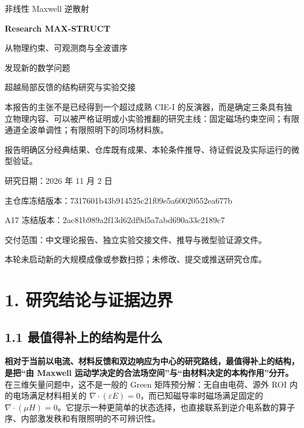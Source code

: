 \documentclass[11pt,a4paper]{article}
\begin{document}
\begin{titlepage}
\vspace*{14mm}
{\Large 非线性 Maxwell 逆散射}\par
\vspace{8mm}
{\Huge\bfseries Research MAX-STRUCT}\par
\vspace{8mm}
{\LARGE 从物理约束、可观测商与全波谱序\par 发现新的数学问题}\par
\vspace{12mm}
{\large 超越局部反馈的结构研究与实验交接}\par
\vspace{14mm}
\begin{minipage}{.92\textwidth}
本报告的主张不是已经得到一个超过成熟 CIE-I 的反演器，而是确定三条具有独立物理内容、可以被严格证明或小实验推翻的研究主线：固定磁场约束空间；有限通道全波单调性；有限照明下的同场材料族。\par
报告明确区分经典结果、仓库既有成果、本轮条件推导、待证假说及实际运行的微型验证。
\end{minipage}
\vfill
{\large 研究日期：2026 年 11 月 2 日}\par
\vspace{3mm}
{\small 主仓库冻结版本：7317601b43b914525c21f09e5a60020552ea677b}\par
{\small A17 冻结版本：2ac81b989a2f13d62df9d5a7abd690a33c2189c7}\par
\vspace{7mm}
{\small 交付范围：中文理论报告、独立实验交接文件、推导与微型验证源文件。\par
本轮未启动新的大规模成像或参数扫掠；未修改、提交或推送研究仓库。}
\end{titlepage}
\tableofcontents
\clearpage
\hypertarget{ux7814ux7a76ux7ed3ux8bbaux4e0eux8bc1ux636eux8fb9ux754c}{%
\section{1.
研究结论与证据边界}\label{ux7814ux7a76ux7ed3ux8bbaux4e0eux8bc1ux636eux8fb9ux754c}}

\hypertarget{ux6700ux503cux5f97ux8865ux4e0aux7684ux7ed3ux6784ux662fux4ec0ux4e48}{%
\subsection{1.1
最值得补上的结构是什么}\label{ux6700ux503cux5f97ux8865ux4e0aux7684ux7ed3ux6784ux662fux4ec0ux4e48}}

\textbf{相对于当前以电流、材料反馈和双边响应为中心的研究路线，最值得补上的结构，是把``由
Maxwell 运动学决定的合法场空间''与``由材料决定的本构作用''分开。}
在三维矢量问题中，这不是一般的 Green 矩阵预分解：无自由电荷、源外 ROI
内的电场满足材料相关的
\(\nabla\cdot(\varepsilon E)=0\)，而已知磁导率时磁场满足固定的
\(\nabla\cdot(\mu H)=0\)。它提示一种更简单的状态选择，也直接联系到逆介电系数的算子序、内部激发秩和有限照明的不可辨识性。
\end{document}
